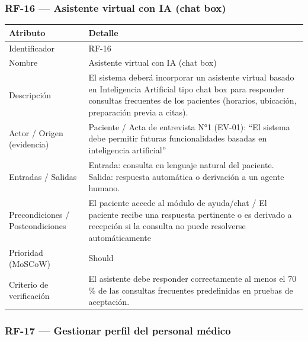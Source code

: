 \documentclass[11pt,a4paper]{article}
\begin{document}
	\subsubsection{RF-16 --- Asistente virtual con IA (chat box)}
	
	\begin{longtable}{p{} p{}}
		
		\toprule
		\textbf{Atributo} & \textbf{Detalle} \\
		\midrule
		\endhead
		
		Identificador & RF-16 \\
		Nombre & Asistente virtual con IA (chat box) \\
		Descripción & El sistema deberá incorporar un asistente virtual basado en Inteligencia Artificial tipo chat box para responder consultas frecuentes de los pacientes (horarios, ubicación, preparación previa a citas). \\
		Actor / Origen (evidencia) & Paciente / Acta de entrevista N°1 (EV-01): ``El sistema debe permitir futuras funcionalidades basadas en inteligencia artificial'' \\
		Entradas / Salidas & Entrada: consulta en lenguaje natural del paciente. Salida: respuesta automática o derivación a un agente humano. \\
		Precondiciones / Postcondiciones & El paciente accede al módulo de ayuda/chat / El paciente recibe una respuesta pertinente o es derivado a recepción si la consulta no puede resolverse automáticamente \\
		Prioridad (MoSCoW) & Should \\
		Criterio de verificación & El asistente debe responder correctamente al menos el 70 \% de las consultas frecuentes predefinidas en pruebas de aceptación. \\
		\bottomrule
	\end{longtable}
	
	\subsubsection{RF-17 --- Gestionar perfil del personal médico}
	
\end{document}
